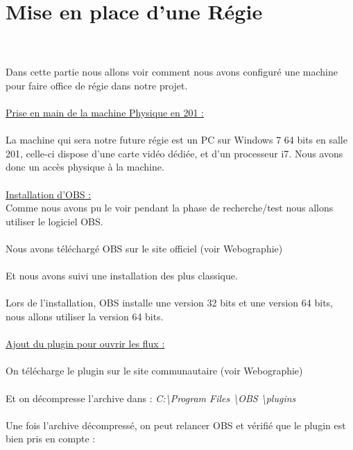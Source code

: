 \documentclass{report}
\begin{document}
    \section{Mise en place d'une Régie}  
    \\
    \\
    
    Dans cette partie nous allons voir comment nous avons configuré une machine pour faire office de régie dans notre projet.
    \\
    \\
    
    \underline{Prise en main de la machine Physique en 201 :}
    \\
    \\
    
    La machine qui sera notre future régie est un PC sur Windows 7 64 bits en salle 201, celle-ci dispose d’une carte vidéo dédiée, et d’un processeur i7. Nous avons donc un accès physique à la machine.
    \\
    \\
    
    \underline{Installation d’OBS :}\\
    
    Comme nous avons pu le voir pendant la phase de recherche/test nous allons utiliser le logiciel OBS. 
    \\
    \\
    Nous avons téléchargé OBS sur le site officiel (voir Webographie)
    \\
    \\
    Et nous avons suivi une installation des plus classique.
    \\
    \\
    Lors de l’installation, OBS installe une version 32 bits et une version 64 bits, nous allons utiliser la version 64 bits.
    \\
    \\
    
    \underline{Ajout du plugin pour ouvrir les flux :}
    \\
    \\
    On télécharge le plugin sur le site communautaire  (voir Webographie) 
    \\

    \\
    Et on décompresse l’archive dans : \textit{C:\textbackslash Program Files \textbackslash OBS \textbackslash plugins}
    \\
    \\
    Une fois l'archive décompressé, on peut relancer OBS et vérifié que le plugin est bien pris en compte :
    
\end{document}
